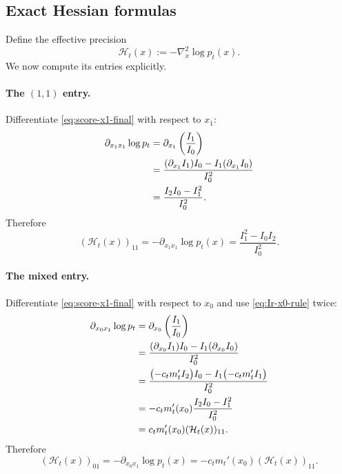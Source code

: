 \documentclass[11pt,a4paper]{article}
\newcommand{\Ht}{\mathcal{H}_t}
\newcommand{\pt}{p_t}
\begin{document}
\subsection{Exact Hessian formulas}

Define the effective precision
\begin{equation}
\Ht(x) := -\nabla_x^2 \log \pt(x).
\label{eq:H-def}
\end{equation}
We now compute its entries explicitly.

\paragraph{The $(1,1)$ entry.}
Differentiate \eqref{eq:score-x1-final} with respect to $x_1$:
\begin{align}
\partial_{x_1 x_1} \log \pt
&=
\partial_{x_1}\left(\frac{I_1}{I_0}\right)
\notag\\
&=
\frac{(\partial_{x_1} I_1) I_0 - I_1 (\partial_{x_1} I_0)}{I_0^2}
\notag\\
&=
\frac{I_2 I_0 - I_1^2}{I_0^2}.
\label{eq:L11}
\end{align}
Therefore
\begin{equation}
(\Ht(x))_{11}
=
-\partial_{x_1 x_1} \log \pt(x)
=
\frac{I_1^2 - I_0 I_2}{I_0^2}.
\label{eq:H11-final}
\end{equation}

\paragraph{The mixed entry.}
Differentiate \eqref{eq:score-x1-final} with respect to $x_0$ and use \eqref{eq:Ir-x0-rule} twice:
\begin{align}
\partial_{x_0 x_1} \log \pt
&=
\partial_{x_0}\left(\frac{I_1}{I_0}\right)
\notag\\
&=
\frac{(\partial_{x_0} I_1) I_0 - I_1 (\partial_{x_0} I_0)}{I_0^2}
\notag\\
&=
\frac{\bigl(-c_t m_t' I_2\bigr) I_0 - I_1 \bigl(-c_t m_t' I_1\bigr)}{I_0^2}
\notag\\
&=
-c_t m_t'(x_0) \frac{I_2 I_0 - I_1^2}{I_0^2}
\notag\\
&=
 c_t m_t'(x_0) (\Ht(x))_{11}.
\label{eq:L01}
\end{align}
Therefore
\begin{equation}
(\Ht(x))_{01}
=
-\partial_{x_0 x_1} \log \pt(x)
=
-c_t m_t'(x_0) (\Ht(x))_{11}.
\label{eq:H01-final}
\end{equation}
\end{document}
